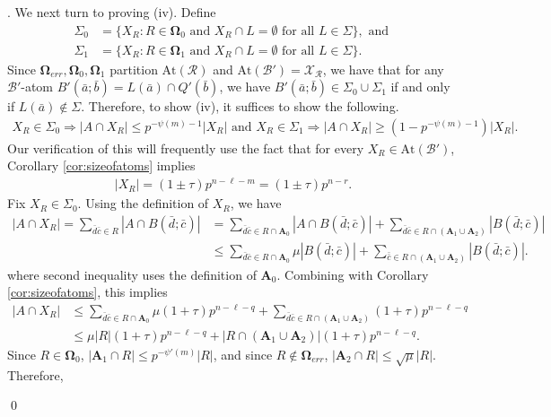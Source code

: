 \documentclass[12pt,oneside,british,a4wide]{amsart}
\numberwithin{equation}{section}
\theoremstyle{definition}
\newcommand{\abar}{\bar{a}}
\newcommand{\bbar}{\bar{b}}
\newcommand{\cbar}{\bar{c}}
\newcommand{\dbar}{\bar{d}}
\newcommand{\calB}{\mathcal{B}}
\newcommand{\calR}{\mathcal{R}}
\newcommand{\calX}{\mathcal{X}}
\newcommand{\At}{{\mathrm{At}}}
\newenvironment{proofof}[1]{\indent{\itshape Proof of #1}.\;}{\qed}
\begin{document}
\begin{proofof}{Theorem \ref{thm:fop}}
We next turn to proving (iv).  Define 
\begin{align*}
\Sigma_0 &=\{X_R: R\in \mathbf{\Omega}_0\text{ and }X_R\cap L=\emptyset \text{ for all }L\in \Sigma\},\text{ and }\\\Sigma_1 &=\{X_R: R\in \mathbf{\Omega}_1\text{ and }X_R\cap L=\emptyset \text{ for all }L\in \Sigma\}.
\end{align*}
Since $\mathbf{\Omega}_{err},\mathbf{\Omega}_0,\mathbf{\Omega}_1$ partition $\At(\calR)$ and $\At(\calB')=\calX_{\calR}$, we have that for  any $\calB'$-atom $B'(\abar;\bbar)=L(\abar)\cap Q'(\bbar)$, we have  $B'(\abar;\bbar)\in \Sigma_0\cup \Sigma_1$ if and only if $L(\abar)\notin \Sigma$.  Therefore, to show (iv), it suffices to show the following.
\begin{align}\label{suffxr}
X_R\in \Sigma_0\Rightarrow |A\cap X_R|\leq p^{-\psi(m)-1}|X_R|\text{ and }X_R\in \Sigma_1\Rightarrow |A\cap X_R|\geq (1-p^{-\psi(m)-1})|X_R|.
\end{align}
  Our verification of this will frequently use the fact that for every  $X_R\in \At(\calB')$,  Corollary \ref{cor:sizeofatoms} implies
\begin{align}\label{align:XL}
|X_{R}|=(1\pm \tau)p^{n-\ell-m}=(1\pm \tau)p^{n-r}.
\end{align}
Fix $X_R\in \Sigma_0$. Using the definition of $X_R$,  we have
  \begin{align*} 
\nonumber|A\cap X_{R}|=\sum_{\dbar\cbar\in R }|A\cap B(\dbar;\cbar)|&=\sum_{\dbar\cbar\in R \cap \mathbf{A}_0}|A\cap B(\dbar;\cbar)|+\sum_{\dbar\cbar\in R\cap (\mathbf{A}_1\cup \mathbf{A}_2)}|B(\dbar;\cbar)|\\
\nonumber&\leq \sum_{\dbar\cbar\in R \cap \mathbf{A}_0}\mu |B(\dbar;\cbar)|+\sum_{\bar\cbar\in R\cap (\mathbf{A}_1\cup \mathbf{A}_2)}|B(\dbar;\cbar)|.
\end{align*}
where second inequality uses the definition of $\mathbf{A}_0$. Combining with Corollary \ref{cor:sizeofatoms}, this implies
\begin{align}\label{112sum}
\nonumber|A\cap X_{R}|&\leq \sum_{\dbar\cbar\in R \cap \mathbf{A}_0}\mu (1+\tau)p^{n-\ell-q} +\sum_{\dbar\cbar\in R\cap (\mathbf{A}_1\cup \mathbf{A}_2)}(1+\tau)p^{n-\ell-q}\\
&\leq \mu |R|(1+\tau)p^{n-\ell-q}+|R\cap (\mathbf{A}_1\cup \mathbf{A}_2)|(1+\tau)p^{n-\ell-q}.
\end{align}
Since $R\in \mathbf{\Omega}_0$,  $|\mathbf{A}_1\cap R|\leq p^{-\psi'(m)}|R|$, and since $R\notin \mathbf{\Omega}_{err}$,  $|\mathbf{A}_{2}\cap R|\leq \sqrt{\mu}|R|$. Therefore,

\end{proofof}
\end{document}
